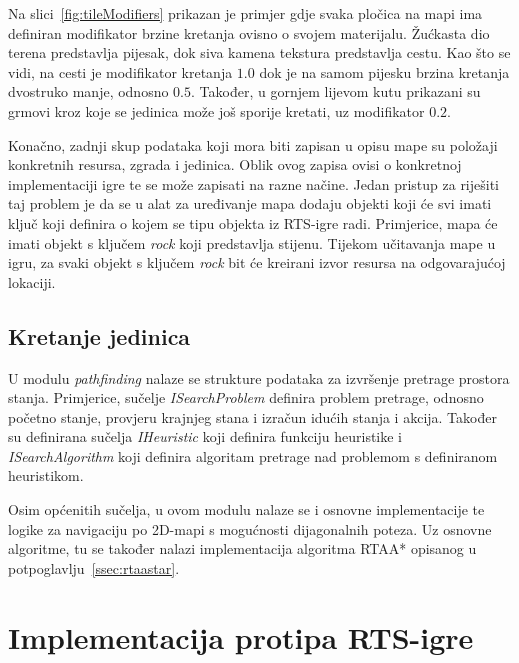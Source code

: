 \documentclass[times, utf8, zavrsni, numeric]{fer}
\begin{document}
\par Na slici~\ref{fig:tileModifiers} prikazan je primjer gdje svaka pločica na mapi ima definiran modifikator brzine kretanja ovisno o svojem materijalu.
Žućkasta dio terena predstavlja pijesak, dok siva kamena tekstura predstavlja cestu.
Kao što se vidi, na cesti je modifikator kretanja \(1.0\) dok je na samom pijesku brzina kretanja dvostruko manje, odnosno \(0.5\).
Također, u gornjem lijevom kutu prikazani su grmovi kroz koje se jedinica može još sporije kretati, uz modifikator \(0.2\).

\par Konačno, zadnji skup podataka koji mora biti zapisan u opisu mape su položaji konkretnih resursa, zgrada i jedinica.
Oblik ovog zapisa ovisi o konkretnoj implementaciji igre te se može zapisati na razne načine.
Jedan pristup za riješiti taj problem je da se u alat za uređivanje mapa dodaju objekti koji će svi imati ključ koji definira o kojem se tipu objekta  iz RTS-igre radi.
Primjerice, mapa će imati objekt s ključem \textit{rock} koji predstavlja stijenu.
Tijekom učitavanja mape u igru, za svaki objekt s ključem \textit{rock} bit će kreirani izvor resursa na odgovarajućoj lokaciji.

\subsection{Kretanje jedinica}

\par U modulu \textit{pathfinding} nalaze se strukture podataka za izvršenje pretrage prostora stanja.
Primjerice, sučelje \textit{ISearchProblem} definira problem pretrage, odnosno početno stanje, provjeru krajnjeg stana i izračun idućih stanja i akcija. 
Također su definirana sučelja \textit{IHeuristic} koji definira funkciju heuristike i \textit{ISearchAlgorithm} koji definira algoritam pretrage nad problemom s definiranom heuristikom.

\par Osim općenitih sučelja, u ovom modulu nalaze se i osnovne implementacije te logike za navigaciju po 2D-mapi s mogućnosti dijagonalnih poteza.
Uz osnovne algoritme, tu se također nalazi implementacija algoritma RTAA* opisanog u potpoglavlju~\ref{ssec:rtaastar}.

\section{Implementacija protipa RTS-igre}
\end{document}
